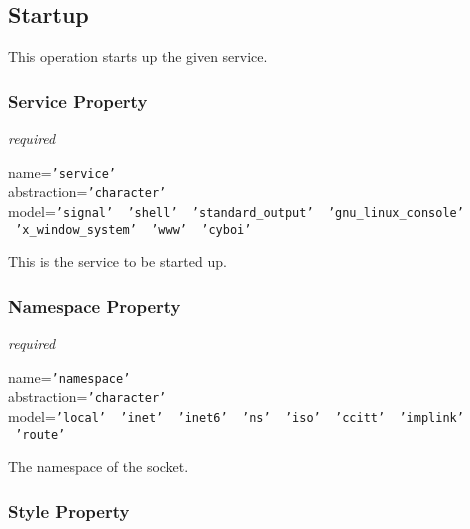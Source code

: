 %
%
%
%
%
%

\subsection{Startup}
\label{startup_heading}

This operation starts up the given service.

\subsubsection{Service Property}

\emph{required}

name=\texttt{'service'}\\
abstraction=\texttt{'character'}\\
model=\texttt{'signal' \vline\ 'shell' \vline\ 'standard\_output'
    \vline\ 'gnu\_linux\_console' \vline\ 'x\_window\_system' \vline\ 'www' \vline\ 'cyboi'}

This is the service to be started up.

\subsubsection{Namespace Property}

\emph{required}

name=\texttt{'namespace'}\\
abstraction=\texttt{'character'}\\
model=\texttt{'local' \vline\ 'inet' \vline\ 'inet6' \vline\ 'ns' \vline\ 'iso' \vline\ 'ccitt' \vline\ 'implink' \vline\ 'route'}

The namespace of the socket.

\subsubsection{Style Property}

